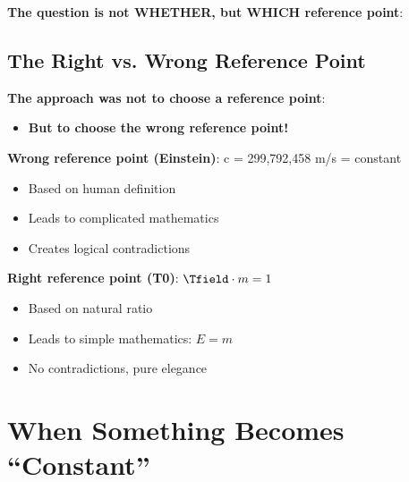 	\textbf{The question is not WHETHER, but WHICH reference point}:
	
	\begin{table}[htbp]
		\centering
		\caption{Reference point systems comparison}
	\end{table}
	
	\subsection{The Right vs. Wrong Reference Point}
	
	\textbf{The approach was not to choose a reference point}:
	\begin{itemize}
		\item \textbf{But to choose the wrong reference point!}
	\end{itemize}
	
	\textbf{Wrong reference point (Einstein)}: c = 299,792,458 m/s = constant
	\begin{itemize}
		\item Based on human definition
		\item Leads to complicated mathematics
		\item Creates logical contradictions
	\end{itemize}
	
	\textbf{Right reference point (T0)}: $\Tfield \cdot m = 1$
	\begin{itemize}
		\item Based on natural ratio
		\item Leads to simple mathematics: $E = m$
		\item No contradictions, pure elegance
	\end{itemize}
	
	\section{When Something Becomes ``Constant''}
	
